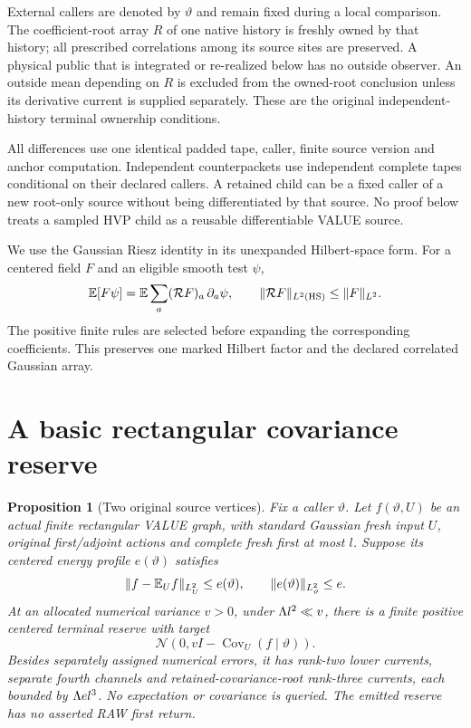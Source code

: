 \documentclass[11pt]{article}
\numberwithin{equation}{section}
\newtheorem{proposition}[theorem]{Proposition}
\theoremstyle{remark}\newtheorem{remark}[theorem]{Remark}
\newcommand{\N}{\mathcal N}\newcommand{\Cov}{\operatorname{Cov}}
\newcommand{\cR}{\mathcal R}\newcommand{\dd}{\,\mathrm d}
\newcommand{\norm}[1]{\lVert#1\rVert}
\begin{document}
External callers are denoted by $\vartheta$ and remain fixed during a local comparison. The coefficient-root array $R$ of one native history is freshly owned by that history; all prescribed correlations among its source sites are preserved. A physical public that is integrated or re-realized below has no outside observer. An outside mean depending on $R$ is excluded from the owned-root conclusion unless its derivative current is supplied separately. These are the original independent-history terminal ownership conditions.

All differences use one identical padded tape, caller, finite source version and anchor computation. Independent counterpackets use independent complete tapes conditional on their declared callers. A retained child can be a fixed caller of a new root-only source without being differentiated by that source. No proof below treats a sampled HVP child as a reusable differentiable VALUE source.

We use the Gaussian Riesz identity in its unexpanded Hilbert-space form. For a centered field $F$ and an eligible smooth test $\psi$,
\[
 \E[F\psi]=\E\sum_a(\cR F)_a\,\partial_a\psi,
 \qquad \norm{\cR F}_{L^2(\HS)}\le\norm F_{L^2}.
\]
The positive finite rules are selected before expanding the corresponding coefficients. This preserves one marked Hilbert factor and the declared correlated Gaussian array.

\section{A basic rectangular covariance reserve}
\label{sec:k2}
\begin{proposition}[Two original source vertices]
\label{prop:k2}
Fix a caller $\vartheta$. Let $f(\vartheta,U)$ be an actual finite rectangular VALUE graph, with standard Gaussian fresh input $U$, original first/adjoint actions and complete fresh first at most $l$. Suppose its centered energy profile $e(\vartheta)$ satisfies
\[
 \norm{f-\E_Uf}_{L^2_U}\le e(\vartheta),\qquad
 \norm{e(\vartheta)}_{L^2_\vartheta}\le e.
\]
At an allocated numerical variance $v>0$, under $\Lambda l^2\ll v$, there is a finite positive centered terminal reserve with target
\[
 \N(0,vI-\Cov_U(f\mid\vartheta)).
\]
Besides separately assigned numerical errors, it has rank-two lower currents, separate fourth channels and retained-covariance-root rank-three currents, each bounded by $\Lambda e l^3$. No expectation or covariance is queried. The emitted reserve has no asserted RAW first return.
\end{proposition}
\end{document}

